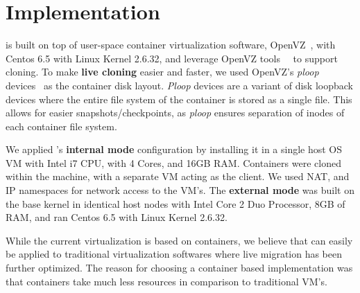 
\section{Implementation}
\label{sec:implementation}

\parikshan is built on top of user-space container virtualization software, OpenVZ~\cite{openvz}, with Centos 6.5 with Linux Kernel 2.6.32, and leverage OpenVZ tools~\cite{vzctl}~\cite{mirkin2008containers} to support cloning.
To make \textbf{live cloning} easier and faster, we used OpenVZ's \textit{ploop} devices~\cite{ploop} as the container disk layout. 
\textit{Ploop} devices are a variant of disk loopback devices where the entire file system of the container is stored as a single file. 
This allows for easier snapshots/checkpoints, as \textit{ploop} ensures separation of inodes of each container file system.

We applied \parikshan 's \textbf{internal mode} configuration by installing it in a single host OS VM with Intel i7 CPU, with 4 Cores, and 16GB RAM. 
Containers were cloned within the machine, with a separate VM acting as the client.
We used NAT, and IP namespaces for network access to the VM's.
The \textbf{external mode} was built on the base kernel in identical host nodes with Intel Core 2 Duo Processor, 8GB of RAM, and ran Centos 6.5 with Linux Kernel 2.6.32.

While the current virtualization is based on containers, we believe that \parikshan can easily be applied to traditional virtualization softwares where live migration has been further optimized.
The reason for choosing a container based implementation was that containers take much less resources in comparison to traditional VM's.

